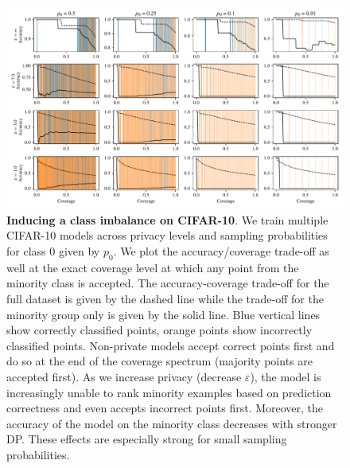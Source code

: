 \begin{figure}[t]
  \centering
	  \includegraphics[width=\linewidth]{figs/sptd_dp/cifar10_classimb.pdf}

\caption[Inducing a class imbalance on CIFAR-10]{\textbf{Inducing a class imbalance on CIFAR-10}. We train multiple CIFAR-10 models across privacy levels and sampling probabilities for class 0 given by $p_0$. We plot the accuracy/coverage trade-off as well at the exact coverage level at which any point from the minority class is accepted. The accuracy-coverage trade-off for the full dataset is given by the dashed line while the trade-off for the minority group only is given by the solid line. Blue vertical lines show correctly classified points, orange points show incorrectly classified points. Non-private models accept correct points first and do so at the end of the coverage spectrum (\ie majority points are accepted first). As we increase privacy (\ie decrease $\varepsilon$), the model is increasingly unable to rank minority examples based on prediction correctness and even accepts incorrect points first. Moreover, the accuracy of the model on the minority class decreases with stronger DP. These effects are especially strong for small sampling probabilities.}
\label{fig:cifar10_classimb}
\end{figure}

